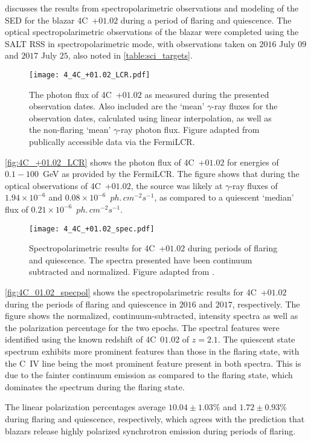 \citep{Schutte4C0102} discusses the results from spectropolarimetric observations and modeling of the \gls{SED} for the blazar 4C~+$01.02$ during a period of flaring and quiescence.
The optical spectropolarimetric observations of the blazar were completed using the \gls{SALT} \gls{RSS} in spectropolarimetric mode, with observations taken on $2016$ July $09$ and $2017$ July $25$, also noted in \autoref{table:sci_targets}.

\begin{figure}[t]
    \centering
    \texttt{[image: 4\_4C\_+01.02\_LCR.pdf]}
    \caption{The photon flux of 4C~+$01.02$ as measured during the presented observation dates. Also included are the `mean' $\gamma$-ray fluxes for the observation dates, calculated using linear interpolation, as well as the non-flaring `mean' $\gamma$-ray photon flux. Figure adapted from publically accessible data via the \gls{FermiLCR}.\protect\footnotemark}
    \label{fig:4C_+01.02_LCR}
\end{figure}

\autoref{fig:4C_+01.02_LCR} shows the photon flux of 4C~+$01.02$ for energies of $0.1 - 100$~GeV as provided by the \gls{FermiLCR}.
The figure shows that during the optical observations of 4C~+$01.02$, the source was likely at $\gamma$-ray fluxes of $1.94 \times 10^{-6}$ and $0.08 \times 10^{-6}$~$ph.\,cm^{-2}s^{-1}$, as compared to a quiescent `median' flux of $0.21 \times 10^{-6}$~$ph.\,cm^{-2}s^{-1}$.

\begin{figure}[t]
    \centering
    \texttt{[image: 4\_4C\_+01.02\_spec.pdf]}
    \caption{Spectropolarimetric results for 4C~+$01.02$ during periods of flaring and quiescence. The spectra presented have been continuum subtracted and normalized. Figure adapted from \citep{Schutte4C0102}.}
    \label{fig:4C_01.02_specpol}
\end{figure}

\autoref{fig:4C_01.02_specpol} shows the spectropolarimetric results for 4C~+$01.02$ during the periods of flaring and quiescence in $2016$ and $2017$, respectively.
The figure shows the normalized, continuum-subtracted, intensity spectra as well as the polarization percentage for the two epochs.
The spectral features were identified using the known redshift of 4C~$01.02$ of $z = 2.1$.
The quiescent state spectrum exhibits more prominent features than those in the flaring state, with the C~IV line being the most prominent feature present in both spectra.
This is due to the fainter continuum emission as compared to the flaring state, which dominates the spectrum during the flaring state.

The linear polarization percentages average $10.04 \pm 1.03\%$ and $1.72 \pm 0.93\%$ during flaring and quiescence, respectively, which agrees with the prediction that blazars release highly polarized synchrotron emission during periods of flaring.
